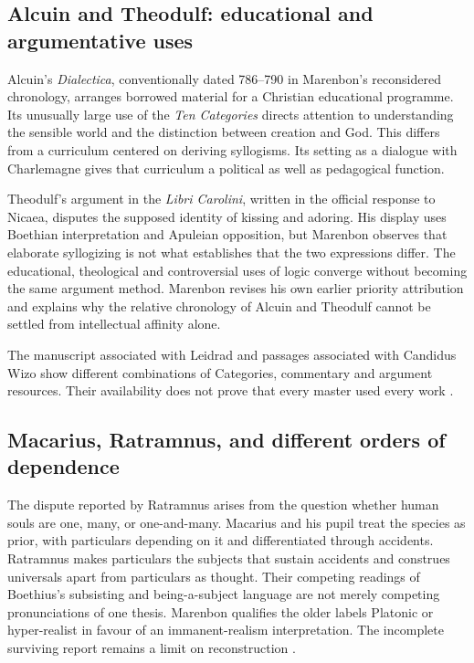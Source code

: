 \subsection{Alcuin and Theodulf: educational and argumentative uses}

Alcuin's \emph{Dialectica}, conventionally dated 786--790 in
Marenbon's reconsidered chronology, arranges borrowed material for
a Christian educational programme. Its unusually large use of the
\emph{Ten Categories} directs attention to understanding the sensible
world and the distinction between creation and God.
This differs from a curriculum centered on deriving syllogisms.
Its setting as a dialogue with Charlemagne gives that curriculum
a political as well as pedagogical function.

Theodulf's argument in the \emph{Libri Carolini}, written in the
official response to Nicaea, disputes the supposed identity of
kissing and adoring. His display uses Boethian interpretation and
Apuleian opposition, but Marenbon observes that elaborate syllogizing
is not what establishes that the two expressions differ.
The educational, theological and controversial uses of logic converge
without becoming the same argument method.
Marenbon revises his own earlier priority attribution and explains
why the relative chronology of Alcuin and Theodulf cannot be
settled from intellectual affinity alone.

The manuscript associated with Leidrad and passages associated with
Candidus Wizo show different combinations of Categories, commentary
and argument resources. Their availability does not prove that
every master used every work
\cite[pp.~22--25]{Marenbon2007FordhamEarlyLatin}.

\subsection{Macarius, Ratramnus, and different orders of dependence}

The dispute reported by Ratramnus arises from the question whether
human souls are one, many, or one-and-many.
Macarius and his pupil treat the species as prior, with particulars
depending on it and differentiated through accidents.
Ratramnus makes particulars the subjects that sustain accidents
and construes universals apart from particulars as thought.
Their competing readings of Boethius's subsisting and being-a-subject
language are not merely competing pronunciations of one thesis.
Marenbon qualifies the older labels Platonic or hyper-realist in
favour of an immanent-realism interpretation. The incomplete
surviving report remains a limit on reconstruction
\cite[pp.~26--27]{Marenbon2007FordhamEarlyLatin}.

